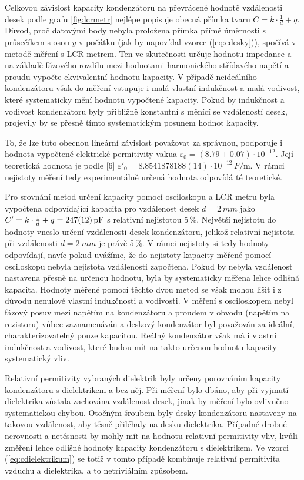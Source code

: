 \documentclass{../concepts/prepareprotokol} %
\begin{document}
Celkovou závislost kapacity kondenzátoru na převrácené hodnotě vzdálenosti desek podle grafu \ref{fig:lcrmetr} nejlépe popisuje obecná přímka tvaru $C = k \cdot \frac{1}{d} + q$. Důvod, proč datovými body nebyla proložena přímka přímé úměrnosti s průsečíkem s osou $y$ v počátku (jak by napovídal vzorec (\ref{eq:cdesky})), spočívá v metodě měření s LCR metrem. Ten ve skutečnosti určuje hodnotu impedance a na základě fázového rozdílu mezi hodnotami harmonického střídavého napětí a proudu vypočte ekvivalentní hodnotu kapacity. V případě neideálního kondenzátoru však do měření vstupuje i malá vlastní indukčnost a malá vodivost, které systematicky mění hodnotu vypočtené kapacity. Pokud by indukčnost a vodivost kondenzátoru byly přibližně konstantní s měnící se vzdáleností desek, projevily by se přesně tímto systematickým posunem hodnot kapacity.

To, že lze tuto obecnou lineární závislost považovat za správnou, podporuje i hodnota vypočtené elektrické permitivity vakua $\varepsilon_0 = \left(8.79 \pm 0.07\right) \cdot 10^{-12}$. Její teoretická hodnota je podle [6] $\varepsilon'_0 = 8.854 187 8188(14) \cdot 10^{-12} \, \si{F \per\meter}$. V rámci nejistoty měření tedy experimentálně určená hodnota odpovídá té teoretické.

Pro srovnání metod určení kapacity pomocí osciloskopu a LCR metru byla vypočtena odpovídající kapacita pro vzdálenost desek $d = \SI{2}{mm}$ jako $C' = k \cdot \frac{1}{d} + q = \SI{247 \pm 12}{pF}$ s relativní nejistotou 5\,\%. Největší nejistotu do hodnoty vneslo určení vzdálenosti desek kondenzátoru, jelikož relativní nejistota při vzdálenosti $d = \SI{2}{mm}$ je právě 5\,\%. V rámci nejistoty si tedy hodnoty odpovídají, navíc pokud uvážíme, že do nejistoty kapacity měřené pomocí osciloskopu nebyla nejistota vzdálenosti započtena. Pokud by nebyla vzdálenost nastavena přesně na určenou hodnotu, byla by systematicky měřena lehce odlišná kapacita. Hodnoty měřené pomocí těchto dvou metod se však mohou lišit i z důvodu nenulové vlastní indukčnosti a vodivosti. V měření s osciloskopem nebyl fázový posuv mezi napětím na kondenzátoru a proudem v obvodu (napětím na rezistoru) vůbec zaznamenáván a deskový kondenzátor byl považován za ideální, charakterizovatelný pouze kapacitou. Reálný kondenzátor však má i vlastní indukčnost a vodivost, které budou mít na takto určenou hodnotu kapacity systematický vliv.

Relativní permitivity vybraných dielektrik byly určeny porovnáním kapacity kondenzátoru s dielektrikem a bez něj. Při měření bylo dbáno, aby při vyjmutí dielektrika zůstala zachována vzdálenost desek, jinak by měření bylo ovlivněno systematickou chybou. Otočným šroubem byly desky kondenzátoru nastaveny na takovou vzdálenost, aby těsně přiléhaly na desku dielektrika. Případné drobné nerovnosti a netěsnosti by mohly mít na hodnotu relativní permitivity vliv, kvůli změření lehce odlišné hodnoty kapacity kondenzátoru s dielektrikem. Ve vzorci (\ref{eq:cdielektrikum}) se totiž v tomto případě kombinuje relativní permitivita vzduchu a dielektrika, a to netriviálním způsobem.
\end{document}
